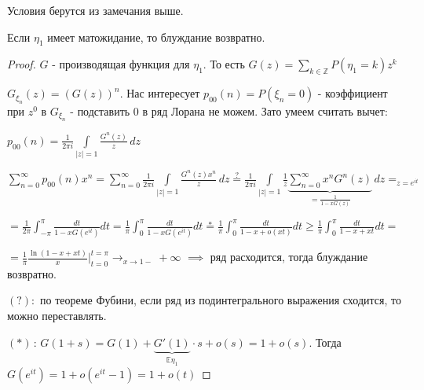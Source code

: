 \begin{theorem} Условия берутся из замечания выше.


    Если $\eta_1$ имеет матожидание, то блуждание возвратно.
\end{theorem}

\begin{proof}
    $G$ - производящая функция для $\eta_1$. То есть $G(z) = \sum\limits_{k \in \mathbb{Z}} P(\eta_1 = k) z^k$

    $G_{\xi_n} (z) = (G(z))^n$. Нас интересует $p_{00} (n) = P(\xi_n = 0)$ - коэффициент при $z^0$ в $G_{\xi_n}$ - подставить 0 в ряд Лорана не можем. Зато умеем считать вычет:

    $p_{00} (n) = \frac{1}{2\pi i} \int\limits_{|z| = 1} \frac{G^n (z)}{z} \, dz$

    $\sum\limits_{n=0}^\infty p_{00} (n)x^n = \sum\limits_{n = 0}^\infty \frac{1}{2\pi i} \int\limits_{|z| = 1} \frac{G^n (z) x^n}{z} \, dz \overset{?}{=} \frac{1}{2\pi i} \int\limits_{|z| = 1} \frac{1}{z} \underbrace{\sum\limits_{n = 0}^\infty x^n G^n (z)}_{= \frac{1}{1 - xG(z)}} \, dz =_{z = e^{it}} $
    
    $= \frac{1}{2\pi} \int_{-\pi}^\pi \frac{dt}{1 - xG(e^{it})} dt = \frac{1}{\pi} \int_0^\pi \frac{dt}{1 - xG(e^{it})}dt \overset{{*}}{=} \frac{1}{\pi} \int_0^\pi \frac{dt}{1 - x + o(xt)}dt \geqslant \frac{1}{\pi} \int_0^\pi \frac{dt}{1 - x + xt}dt =$
    
    $= \frac{1}{\pi} \frac{\ln (1 - x + xt)}{x} \bigg |_{t=0}^{t = \pi} \rightarrow_{x \to 1-} +\infty$ $\implies$ ряд расходится, тогда блуждание возвратно.

    $(?): $ по теореме Фубини, если ряд из подинтегрального выражения сходится, то можно переставлять.

    $(*) \, : \, G(1 + s) = G(1) + \underbrace{G' (1)}_{\mathbb{E} \eta_1} \cdot s + o(s) = 1 + o(s)$. Тогда $G(e^{it}) = 1 + o(e^{it} - 1) = 1 + o(t)$
\end{proof}

